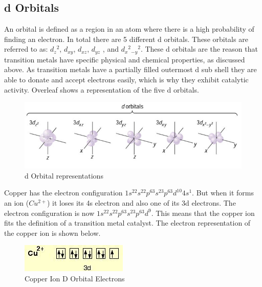 	\subsection{d Orbitals} 

An orbital is defined as a region in an atom where there is a high probability of finding an electron. In total there are 5 different d orbitals. These orbitals are referred to as: $d_z$$^2$, $d_{xy}$, $d_{xz}$, $d_{yz}$ , and $d_x$$^2$$_{-y}$$^2$. These d orbitals are the reason that transition metals have specific physical and chemical properties, as discussed above. As transition metals have a partially filled outermost d sub shell they are able to donate and accept electrons easily, which is why they exhibit catalytic activity. Overleaf shows a representation of the five d orbitals.


\begin{figure}[H]
    \includegraphics[width=\textwidth]{./Planning/Images/DOrbitals.jpg}
    \caption{d Orbital representations} \label{fig:D Orbitals}
\end{figure}

Copper has the electron configuration $1s^22s^22p^63s^23p^63d^{10}4s^1$. But when it forms an ion ($Cu^{2+}$) it loses its 4s electron and also one of its 3d electrons. The electron configuration is now  $1s^22s^22p^63s^23p^63d^9$.  This means that the copper ion fits the definition of a transition metal catalyst. The electron representation of the copper ion is shown below.

\begin{figure}[H]
    \includegraphics[width=\textwidth]{./Planning/Images/CopperDOrbital.jpg}
    \caption{Copper Ion D Orbital Electrons} \label{fig:Copper D Orbital}
\end{figure}
	

